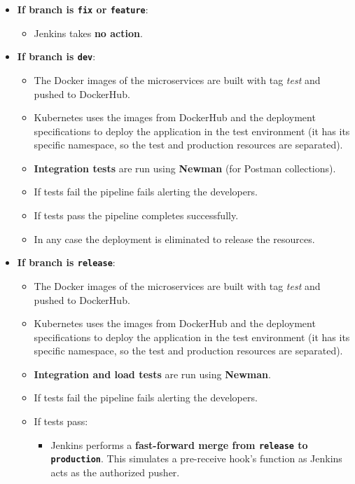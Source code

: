\begin{itemize}
    \item \textbf{If branch is \texttt{fix} or \texttt{feature}}:
    \begin{itemize}
        \item Jenkins takes \textbf{no action}.
    \end{itemize}
    \item \textbf{If branch is \texttt{dev}}:
    \begin{itemize}
        \item The Docker images of the microservices are built with tag \textit{test} and pushed to DockerHub.
        \item Kubernetes uses the images from DockerHub and the deployment specifications to deploy the application in the test environment (it has its specific namespace, so the test and production resources are separated).
        \item \textbf{Integration tests} are run using \textbf{Newman} (for Postman collections).
        \item If tests fail the pipeline fails alerting the developers.
        \item If tests pass the pipeline completes successfully.
        \item In any case the deployment is eliminated to release the resources.
    \end{itemize}
    \item \textbf{If branch is \texttt{release}}:
    \begin{itemize}
        \item The Docker images of the microservices are built with tag \textit{test} and pushed to DockerHub.
        \item Kubernetes uses the images from DockerHub and the deployment specifications to deploy the application in the test environment (it has its specific namespace, so the test and production resources are separated).
        \item \textbf{Integration and load tests} are run using \textbf{Newman}.
        \item If tests fail the pipeline fails alerting the developers.
        \item If tests pass:
        \begin{itemize}
            \item Jenkins performs a \textbf{fast-forward merge from \texttt{release} to \texttt{production}}. This simulates a pre-receive hook's function as Jenkins acts as the authorized pusher.

\end{itemize}
\end{itemize}
\end{itemize}
